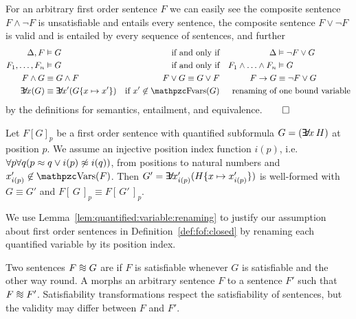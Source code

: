 \begin{example}
	For an arbitrary first order sentence \( F \)
	we can easily see the composite sentence \( F\land\lnot F \)
	is unsatisfiable and entails every sentence,
	the composite sentence \( F\lor\lnot F \) is valid and is entailed by every sequence of sentences, and further
	\begin{align*}
	\Delta, F&\entails G  &\text{if and only if} && \Delta &\entails \lnot F\lor G
	\\
	F_1,\ldots,F_n&\entails G  &\text{if and only if} && F_1\land\ldots\land F_n&\entails G
	\\
	F\land G&\equival G\land F &F\lor G\equival G\lor F && F\limp G &\equival \lnot F\lor G
	\\
	\quantify x (G) &\equiv \quantify x' (G \{x\mapsto x'\} )
	&\text{if } x' \not\in\fvar(G)
	&&\text{renaming of} &\text{ one bound variable}
	\end{align*}
	by the definitions for semantics, entailment, and equivalence.\hfill \( \qed \)
\end{example}

\begin{lemma}\label{lem:quantified:variable:renaming}
	Let \( {F[G]}_p \)
	be a first order sentence with quantified subformula
	\( G = (\quantify x\,H) \) at position \( p \).
	We assume an injective position index function \( i(p) \),
	i.e.~\( \forall p \forall q (p \approx q \lor i(p) \not\approx i(q)  ) \),
	from positions to natural numbers
	and \( x'_{i(p)} \not\in\var(F) \).
	Then \( G' = \quantify x'_{i(p)} (H\{x\mapsto x'_{i(p)}\}) \)
	is well-formed with
	\( G \equiv G' \) and
	\(
		{F[\,G\,]}_p
		\equiv
		{F[\,G'\,]}_p
	\).
\end{lemma}

\noindent We use Lemma~\ref{lem:quantified:variable:renaming}
to justify our assumption about first order sentences
in Definition~\vref{def:fof:closed} by renaming each
quantified variable by its position index.

\begin{definition}\label{def:equisatisfiable}
	Two sentences \( F \equisat G \) are 
	if \( F \) is satisfiable whenever \( G \) is satisfiable
	and the other way round.
	A  morphs an arbitrary sentence
	\( F \) to a sentence \( F' \) such that \( F \equisat F' \).
	Satisfiability transformations respect the satisfiability of sentences,
	but the validity may differ between \( F \) and \( F' \).
\end{definition}

